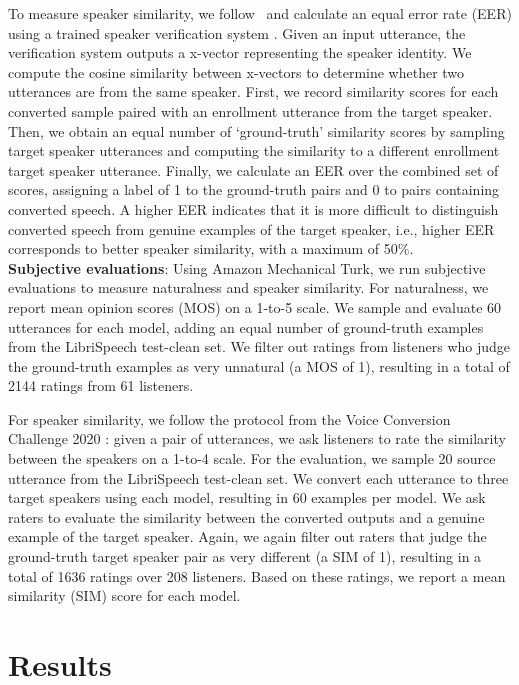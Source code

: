 \documentclass{INTERSPEECH2023}
\begin{document}
To measure speaker similarity, we follow~\cite{softvc} and calculate an equal error rate (EER) using a trained speaker verification system \cite{xvector}.
Given an input utterance, the verification system outputs a x-vector representing the speaker identity.
We compute the cosine similarity between x-vectors to determine whether two utterances are from the same speaker.
First, we record similarity scores for each converted sample paired with an enrollment utterance from the target speaker.
Then, we obtain an equal number of `ground-truth' similarity scores by sampling target speaker utterances and computing the similarity to a different enrollment target speaker utterance. Finally, we calculate an EER over the combined set of scores, assigning a label of 1 to the ground-truth pairs and 0 to pairs containing converted speech.
A higher EER indicates that it is more difficult to distinguish converted speech from genuine examples of the target speaker, i.e., higher EER corresponds to better speaker similarity, with a maximum of 50\%.\\

\noindent \textbf{Subjective evaluations}:
Using Amazon Mechanical Turk, we run subjective evaluations to measure naturalness and
speaker similarity.
For naturalness, we report mean opinion scores (MOS) on a 1-to-5 scale.
We sample and evaluate 60 utterances for each model, adding an equal number of ground-truth examples from the LibriSpeech test-clean set.
We filter out ratings from listeners who judge the ground-truth examples as very unnatural (a MOS of 1), resulting in a total of 2144 ratings from 61 listeners.

For speaker similarity, we follow the protocol from the Voice Conversion Challenge 2020 \cite{vcc2020}:
given a pair of utterances, we ask listeners to rate the similarity between the speakers on a 1-to-4 scale.
For the evaluation, we sample 20 source utterance from the LibriSpeech test-clean set.
We convert each utterance to three target speakers using each model, resulting in 60 examples per model.
We ask raters to evaluate the similarity between the converted outputs and a genuine example of the target speaker.
Again, we again filter out raters that judge the ground-truth target speaker pair as very different (a SIM of 1),
resulting in a total of 1636 ratings over 208 listeners. 
Based on these ratings, we report a mean similarity (SIM) score for each model.




\section{Results} \label{sec:5_results}
\end{document}
